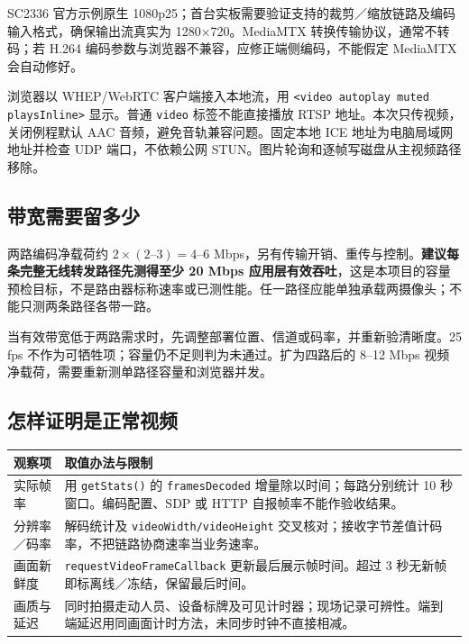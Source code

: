 \documentclass[UTF8,a4paper,11pt,fontset=windows]{ctexart}
\newcommand{\code}[1]{{\small\nolinkurl{#1}}}
\begin{document}
SC2336 官方示例原生 1080p25；首台实板需要验证支持的裁剪／缩放链路及编码输入格式，确保输出流真实为 1280×720。MediaMTX 转换传输协议，通常不转码；若 H.264 编码参数与浏览器不兼容，应修正端侧编码，不能假定 MediaMTX 会自动修好。

浏览器以 WHEP/WebRTC 客户端接入本地流，用 \texttt{<video autoplay muted playsInline>} 显示。普通 \code{video} 标签不能直接播放 RTSP 地址。本次只传视频，关闭例程默认 AAC 音频，避免音轨兼容问题。固定本地 ICE 地址为电脑局域网地址并检查 UDP 端口，不依赖公网 STUN。图片轮询和逐帧写磁盘从主视频路径移除。
\subsection*{带宽需要留多少}
两路编码净载荷约 \(2\times(2\text{--}3)=4\text{--}6\) Mbps，另有传输开销、重传与控制。\textbf{建议每条完整无线转发路径先测得至少 20 Mbps 应用层有效吞吐}，这是本项目的容量预检目标，不是路由器标称速率或已测性能。任一路径应能单独承载两摄像头；不能只测两条路径各带一路。

当有效带宽低于两路需求时，先调整部署位置、信道或码率，并重新验清晰度。25 fps 不作为可牺牲项；容量仍不足则判为未通过。扩为四路后的 8--12 Mbps 视频净载荷，需要重新测单路径容量和浏览器并发。
\subsection*{怎样证明是正常视频}
\par\noindent\begin{tabularx}{\linewidth}{@{}p{30mm}Y@{}}\toprule
观察项 & 取值办法与限制 \\\midrule
实际帧率 & 用 \code{getStats()} 的 \code{framesDecoded} 增量除以时间；每路分别统计 10 秒窗口。编码配置、SDP 或 HTTP 自报帧率不能作验收结果。\\
分辨率／码率 & 解码统计及 \code{videoWidth/videoHeight} 交叉核对；接收字节差值计码率，不把链路协商速率当业务速率。\\
画面新鲜度 & \code{requestVideoFrameCallback} 更新最后展示帧时间。超过 3 秒无新帧即标离线／冻结，保留最后时间。\\
画质与延迟 & 同时拍摄走动人员、设备标牌及可见计时器；现场记录可辨性。端到端延迟用同画面计时方法，未同步时钟不直接相减。\\\bottomrule
\end{tabularx}\par
\end{document}
